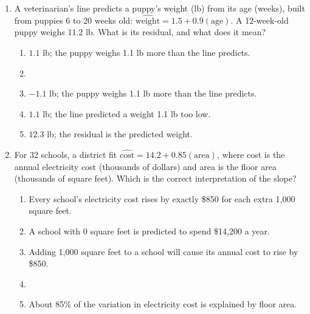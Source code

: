 \documentclass[12pt]{article}
\begin{document}
\begin{enumerate}[leftmargin=1.9em, itemsep=0.13in]
  \boxguard[9]
  \item A veterinarian's line predicts a puppy's weight (lb) from its age (weeks), built from
        puppies 6 to 20 weeks old: $\widehat{\text{weight}} = 1.5 + 0.9(\text{age})$. A
        12-week-old puppy weighs 11.2 lb. What is its residual, and what does it mean?
        \begin{enumerate}[label=\textbf{(\Alph*)}, leftmargin=2.2em, itemsep=2pt]
          \item $1.1$ lb; the puppy weighs 1.1 lb more than the line predicts.
          \item {}
          \item $-1.1$ lb; the puppy weighs 1.1 lb more than the line predicts.
          \item $1.1$ lb; the line predicted a weight 1.1 lb too low.
          \item $12.3$ lb; the residual is the predicted weight.\hfill{}\rule[-0.2in]{0pt}{0.48in}
        \end{enumerate}

  \boxguard[11]
  \item For 32 schools, a district fit
        $\widehat{\text{cost}} = 14.2 + 0.85(\text{area})$, where cost is the annual electricity
        cost (thousands of dollars) and area is the floor area (thousands of square feet).
        Which is the correct interpretation of the slope?
        \begin{enumerate}[label=\textbf{(\Alph*)}, leftmargin=2.2em, itemsep=2pt]
          \item Every school's electricity cost rises by exactly \$850 for each extra
                1{,}000 square feet.
          \item A school with 0 square feet is predicted to spend \$14{,}200 a year.
          \item Adding 1{,}000 square feet to a school will cause its annual cost to rise by
                \$850.
          \item {}
          \item About 85\% of the variation in electricity cost is explained by floor area.\hfill{}\rule[-0.2in]{0pt}{0.48in}
        \end{enumerate}


\end{enumerate}
\end{document}
